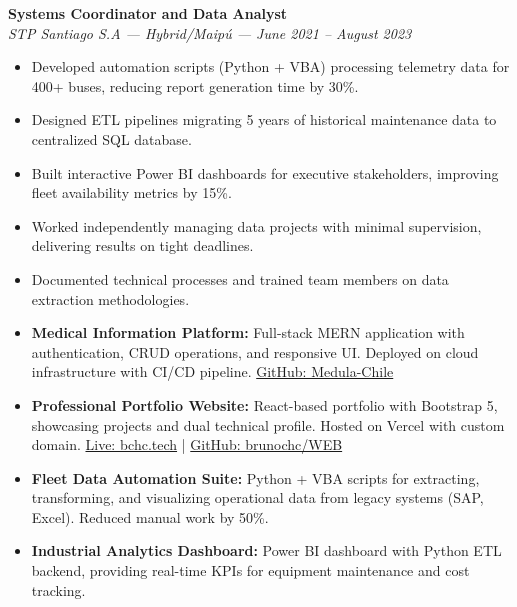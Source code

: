 \documentclass[10pt,letterpaper]{article}
\begin{document}
\vspace{0.2cm}

\noindent \textbf{Systems Coordinator and Data Analyst} \\
\textit{STP Santiago S.A — Hybrid/Maipú — June 2021 – August 2023}
\begin{itemize}
    \item Developed automation scripts (Python + VBA) processing telemetry data for 400+ buses, reducing report generation time by 30\%.
    \item Designed ETL pipelines migrating 5 years of historical maintenance data to centralized SQL database.
    \item Built interactive Power BI dashboards for executive stakeholders, improving fleet availability metrics by 15\%.
    \item Worked independently managing data projects with minimal supervision, delivering results on tight deadlines.
    \item Documented technical processes and trained team members on data extraction methodologies.
\end{itemize}

\vspace{0.4cm}


\vspace{0.3cm}

\begin{itemize}
    \item \textbf{Medical Information Platform:} Full-stack MERN application with authentication, CRUD operations, and responsive UI. Deployed on cloud infrastructure with CI/CD pipeline. \href{https://github.com/Medula-Chile}{GitHub: Medula-Chile}
    \item \textbf{Professional Portfolio Website:} React-based portfolio with Bootstrap 5, showcasing projects and dual technical profile. Hosted on Vercel with custom domain. \href{https://bchc.tech}{Live: bchc.tech} | \href{https://github.com/brunochc/WEB}{GitHub: brunochc/WEB}
    \item \textbf{Fleet Data Automation Suite:} Python + VBA scripts for extracting, transforming, and visualizing operational data from legacy systems (SAP, Excel). Reduced manual work by 50\%.
    \item \textbf{Industrial Analytics Dashboard:} Power BI dashboard with Python ETL backend, providing real-time KPIs for equipment maintenance and cost tracking.
\end{itemize}
\end{document}
